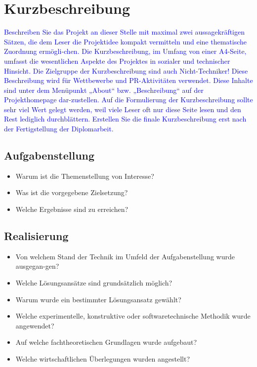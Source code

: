 \documentclass[12pt, twoside]{article}
\begin{document}
\newpage

\pagestyle{fancy}
\normalsize

\section*{Kurzbeschreibung}
\textcolor{blue}{
Beschreiben Sie das Projekt an dieser Stelle mit maximal zwei aussagekräftigen Sätzen, die dem Leser die Projektidee kompakt vermitteln und eine thematische Zuordnung ermögli-chen.
Die Kurzbeschreibung, im Umfang von einer A4-Seite, umfasst die wesentlichen Aspekte des Projektes in sozialer und technischer Hinsicht. Die Zielgruppe der Kurzbeschreibung sind auch Nicht-Techniker! 
Diese Beschreibung wird für Wettbewerbe und PR-Aktivitäten verwendet. Diese Inhalte sind unter dem Menüpunkt „About“ bzw. „Beschreibung“ auf der Projekthomepage dar-zustellen. Auf die Formulierung der Kurzbeschreibung sollte sehr viel Wert gelegt werden, weil viele Leser oft nur diese Seite lesen und den Rest lediglich durchblättern. Erstellen Sie die finale Kurzbeschreibung erst nach der Fertigstellung der Diplomarbeit.}

\color{blue}
\subsection*{Aufgabenstellung}
\begin{itemize}
    \item Warum ist die Themenstellung von Interesse?
    \item Was ist die vorgegebene Zielsetzung?
    \item Welche Ergebnisse sind zu erreichen?
\end{itemize}

\subsection*{Realisierung}
\begin{itemize}
    \item Von welchem Stand der Technik im Umfeld der Aufgabenstellung wurde ausgegan-gen?
    \item Welche Lösungsansätze sind grundsätzlich möglich?
    \item Warum wurde ein bestimmter Lösungsansatz gewählt?
    \item Welche experimentelle, konstruktive oder softwaretechnische Methodik wurde angewendet?
    \item Auf welche fachtheoretischen Grundlagen wurde aufgebaut?
    \item Welche wirtschaftlichen Überlegungen wurden angestellt?
\end{itemize}
\end{document}

